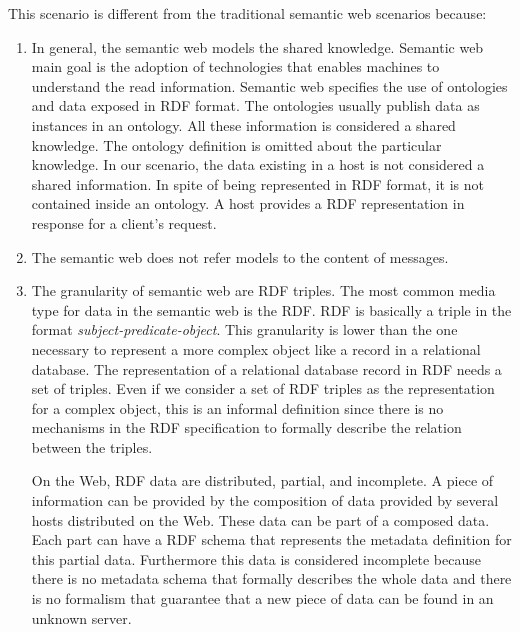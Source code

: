 \documentclass{singlecol-new}
\theoremstyle{TH}{
\newtheorem{lemma}{Lemma}
\newtheorem{theorem}[lemma]{Theorem}
\newtheorem{corrolary}[lemma]{Corrolary}
\newtheorem{conjecture}[lemma]{Conjecture}
\newtheorem{proposition}[lemma]{Proposition}
\newtheorem{claim}[lemma]{Claim}
\newtheorem{stheorem}[lemma]{Wrong Theorem}
\newtheorem{algorithm}{Algorithm}
}
\theoremstyle{THrm}{
\newtheorem{definition}{Definition}[section]
\newtheorem{question}{Question}[section]
\newtheorem{remark}{Remark}
\newtheorem{scheme}{Scheme}
}
\theoremstyle{THhit}{
\newtheorem{case}{Case}[section]
}
\begin{document}
This scenario is different from the traditional semantic web scenarios because:
\begin{enumerate}
	\item In general, the semantic web models the shared knowledge. Semantic web main goal is the adoption of technologies that enables machines to understand the read information. 
	Semantic web specifies the use of ontologies and data exposed in RDF format. 
	The ontologies usually publish data as instances in an ontology. 
	All these information is considered a shared knowledge. The ontology definition is omitted about the particular knowledge.
	In our scenario, the data existing in a host is not considered a shared information. In spite of being represented in RDF format, it is not contained inside an ontology. A host provides a RDF representation in response for a client's request.
	\item The semantic web does not refer models to the content of messages. 
	\item The granularity  of semantic web are RDF triples. The most common media type for data in the semantic web is the RDF. RDF is basically a triple in the format \textit{subject-predicate-object}. 
	This granularity is lower than the one necessary to represent a more complex object like a record in a relational database. 	
	The representation of a relational database record in RDF needs a set of triples.  
	Even if we consider a set of RDF triples as the representation for a complex object, this is an informal definition since there is no mechanisms in the RDF specification to formally describe the relation between the triples.
	
	On the Web, RDF data are distributed, partial, and incomplete. 
	A piece of information can be provided by the composition of data provided by several hosts distributed on the Web. These data can be part of a composed data.
	Each part can have a RDF schema that represents the metadata definition for this partial data.
	Furthermore this data is considered incomplete because there is no metadata schema that formally describes the whole data and there is no formalism that guarantee that a new piece of data can be found in an unknown server. 
	

\end{enumerate}
\end{document}
